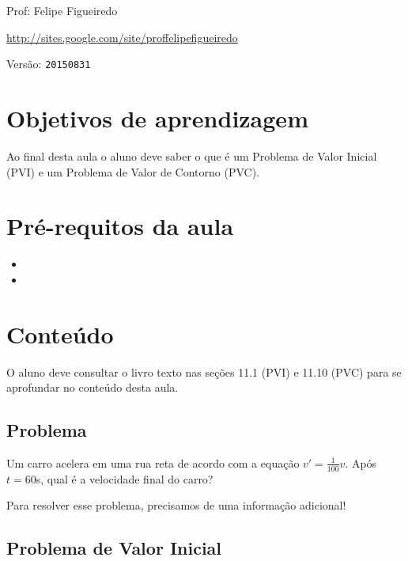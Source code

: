 \documentclass[a4paper]{article}
\begin{document}
\parbox[c]{.825\textwidth}{\raggedright%
{Prof: Felipe Figueiredo\par}
{\url{http://sites.google.com/site/proffelipefigueiredo}\par}
}

Versão: \verb|20150831|



\section{Objetivos de aprendizagem}

Ao final desta aula o aluno deve saber o que é um Problema de Valor
Inicial (PVI) e um Problema de Valor de Contorno (PVC).


\section{Pré-requitos da aula}

\begin{itemize}
\item 
\item 
\end{itemize}

\section{Conteúdo}

O aluno deve consultar o livro texto nas seções 11.1 (PVI) e 11.10 (PVC)
para se aprofundar no conteúdo desta aula.

\subsection{Problema}

Um carro acelera em uma rua reta de acordo com a equação
$v'=\frac{1}{100}v$. Após $t=60$s, qual é a velocidade final do carro?

Para resolver esse problema, precisamos de uma informação adicional!

\subsection{Problema de Valor Inicial}
\end{document}
